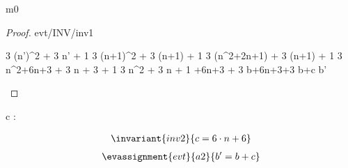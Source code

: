 \documentclass[12pt]{amsart}
\begin{document}
\begin{machine}{m0}
%
\begin{proof}{evt/INV/inv1}
	\begin{calculation}
		3 \cdot (n')^2 + 3 \cdot n' + 1
	\hint{=}{ \ref{a0} }
		3 \cdot (n+1)^2 + 3 \cdot (n+1) + 1
		3 \cdot (n^2+2\cdot n+1) + 3 \cdot (n+1) + 1
		3 \cdot n^2+6\cdot n+3 + 3 \cdot n + 3 + 1
		3 \cdot n^2 + 3 \cdot n + 1 +6\cdot n+3 + 3
	\hint{=}{ \ref{inv1} }
		b+6\cdot n+3+3
		b+c
		b'
	\end{calculation}
\end{proof}
%
\begin{variable}
	c : \Int
\end{variable}
%
\begin{align*}
\invariant{inv2}
{	c = 6 \cdot n + 6	}
\end{align*} 
%
\begin{align*}
\evassignment{evt}{a2}
{	b' = b + c	}
\end{align*}


\end{machine}
\end{document}
